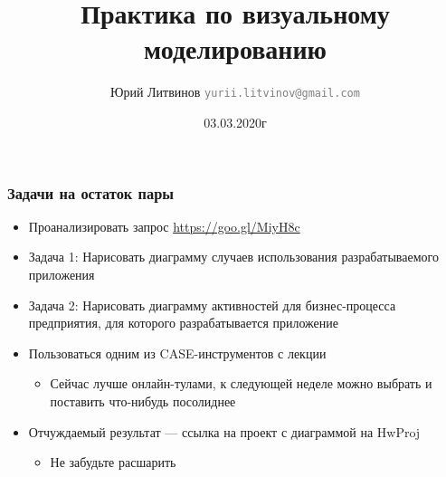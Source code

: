 \documentclass[xetex,mathserif,serif]{beamer}
\title{Практика по визуальному моделированию}
\author[Юрий Литвинов]{Юрий Литвинов \newline \textcolor{gray}{\small\texttt{yurii.litvinov@gmail.com}}}
\date{03.03.2020г}
\begin{document}
	
	\frame{\titlepage}

	\begin{frame}
		\frametitle{Задачи на остаток пары}
		\begin{itemize}
			\item Проанализировать запрос \url{https://goo.gl/MiyH8c}
			\item Задача 1: Нарисовать диаграмму случаев использования разрабатываемого приложения
			\item Задача 2: Нарисовать диаграмму активностей для бизнес-процесса предприятия, для которого разрабатывается приложение
			\item Пользоваться одним из CASE-инструментов с лекции
			\begin{itemize}
				\item Сейчас лучше онлайн-тулами, к следующей неделе можно выбрать и поставить что-нибудь посолиднее
			\end{itemize}
			\item Отчуждаемый результат --- ссылка на проект с диаграммой на HwProj
			\begin{itemize}
				\item Не забудьте расшарить
			\end{itemize}
		\end{itemize}
	\end{frame}
\end{document}
